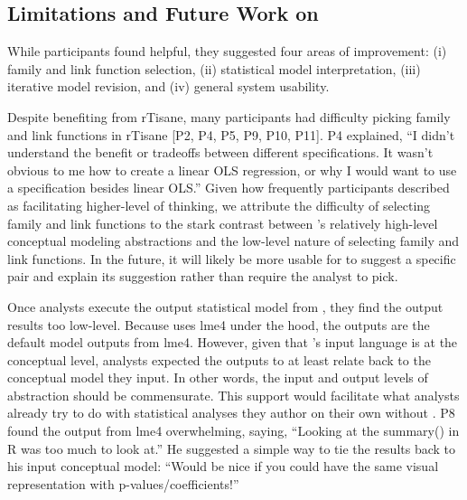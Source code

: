
\subsection{Limitations and Future Work on \rTisane}
While participants found \rTisane helpful, they suggested four areas of
improvement: (i) family and link function selection, (ii) statistical model
interpretation, (iii) iterative model revision, and (iv) general system
usability. 

Despite benefiting from rTisane, many participants had difficulty picking family
and link functions in rTisane [P2, P4, P5, P9, P10, P11]. P4 explained, ``I
didn't understand the benefit or tradeoffs between different specifications. It
wasn't obvious to me how to create a linear OLS regression, or why I would want
to use a specification besides linear OLS.'' Given how frequently participants
described \rTisane as facilitating higher-level of thinking, we attribute the
difficulty of selecting family and link functions to the stark contrast between
\rTisane’s relatively high-level conceptual modeling abstractions and the
low-level nature of selecting family and link functions. In the future, it will
likely be more usable for \rTisane to suggest a specific pair and explain its
suggestion rather than require the analyst to pick.

Once analysts execute the output statistical model from \rTisane, they find the
output results too low-level. Because \rTisane uses lme4 under the hood, the
outputs are the default model outputs from lme4. However, given that \rTisane's
input language is at the conceptual level, analysts expected the outputs to at
least relate back to the conceptual model they input. In other words, the input
and output levels of abstraction should be commensurate. This support would
facilitate what analysts already try to do with statistical analyses they author
on their own without \rTisane. P8 found the output from lme4 overwhelming,
saying, ``Looking at the summary() in R was too much to look at.'' He suggested a
simple way to tie the results back to his input conceptual model: ``Would be nice
if you could have the same visual representation with p-values/coefficients!''


